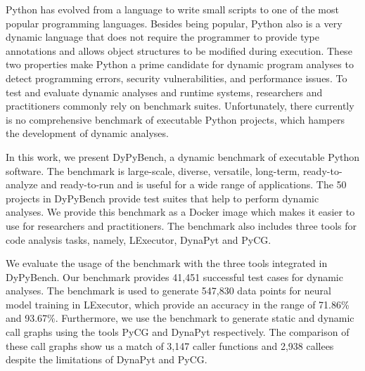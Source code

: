 Python has evolved from a language to write small scripts to one of the most popular programming languages.
Besides being popular, Python also is a very dynamic language that does not require the programmer to provide type annotations and allows object structures to be modified during execution.
These two properties make Python a prime candidate for dynamic program analyses to detect programming errors, security vulnerabilities, and performance issues.
To test and evaluate dynamic analyses and runtime systems, researchers and practitioners commonly rely on benchmark suites.
Unfortunately, there currently is no comprehensive benchmark of executable Python projects, which hampers the development of dynamic analyses.

In this work, we present DyPyBench, a dynamic benchmark of executable Python software.
The benchmark is large-scale, diverse, versatile, long-term, ready-to-analyze and ready-to-run and is useful for a wide range of applications. 
The 50 projects in DyPyBench provide test suites that help to perform dynamic analyses.
We provide this benchmark as a Docker image which makes it easier to use for researchers and practitioners.
The benchmark also includes three tools for code analysis tasks, namely, LExecutor, DynaPyt and PyCG.

We evaluate the usage of the benchmark with the three tools integrated in DyPyBench.
Our benchmark provides 41,451 successful test cases for dynamic analyses.
The benchmark is used to generate 547,830 data points for neural model training in LExecutor, which provide an accuracy in the range of 71.86\% and 93.67\%.
Furthermore, we use the benchmark to generate static and dynamic call graphs using the tools PyCG and DynaPyt respectively.
The comparison of these call graphs show us a match of 3,147 caller functions and 2,938 callees despite the limitations of DynaPyt and PyCG.
